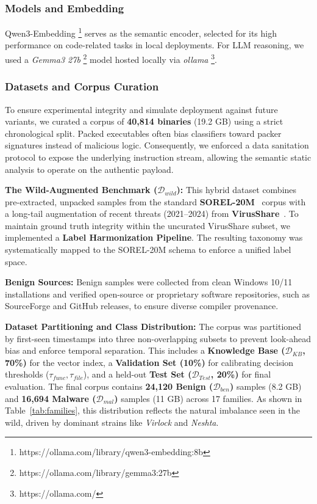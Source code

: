 \documentclass[pdflatex,sn-mathphys-num]{sn-jnl}
\begin{document}
\subsubsection{Models and Embedding}
Qwen3-Embedding \footnote{https://ollama.com/library/qwen3-embedding:8b} serves as the semantic encoder, selected for its high performance on code-related tasks in local deployments. For LLM reasoning, we used a \textit{Gemma3 27b} \footnote{https://ollama.com/library/gemma3:27b} model hosted locally via \textit{ollama} \footnote{https://ollama.com/}.

\subsubsection{Datasets and Corpus Curation}
\label{subsub:datasets}
To ensure experimental integrity and simulate deployment against future variants, we curated a corpus of \textbf{40,814 binaries} (19.2 GB) using a strict chronological split. Packed executables often bias classifiers toward packer signatures instead of malicious logic. Consequently, we enforced a data sanitation protocol to expose the underlying instruction stream, allowing the semantic static analysis to operate on the authentic payload.

\textbf{The Wild-Augmented Benchmark ($\mathcal{D}_{wild}$):} This hybrid dataset combines pre-extracted, unpacked samples from the standard \textbf{SOREL-20M}~\cite{harang2020sorel20m} corpus with a long-tail augmentation of recent threats (2021--2024) from \textbf{VirusShare}~\cite{VirusShare}. To maintain ground truth integrity within the uncurated VirusShare subset, we implemented a \textbf{Label Harmonization Pipeline}. The resulting taxonomy was systematically mapped to the SOREL-20M schema to enforce a unified label space.

\textbf{Benign Sources:} Benign samples were collected from clean Windows 10/11 installations and verified open-source or proprietary software repositories, such as SourceForge and GitHub releases, to ensure diverse compiler provenance.

\textbf{Dataset Partitioning and Class Distribution:}
The corpus was partitioned by first-seen timestamps into three non-overlapping subsets to prevent look-ahead bias and enforce temporal separation. This includes a \textbf{Knowledge Base ($\mathcal{D}_{KB}$, 70\%)} for the vector index, a \textbf{Validation Set (10\%)} for calibrating decision thresholds ($\tau_{func}, \tau_{file}$), and a held-out \textbf{Test Set ($\mathcal{D}_{Test}$, 20\%)} for final evaluation. The final corpus contains \textbf{24,120 Benign ($\mathcal{D}_{ben}$)} samples (8.2 GB) and \textbf{16,694 Malware ($\mathcal{D}_{mal}$)} samples (11 GB) across 17 families. As shown in Table~\ref{tab:families}, this distribution reflects the natural imbalance seen in the wild, driven by dominant strains like \textit{Virlock} and \textit{Neshta}.
\end{document}
